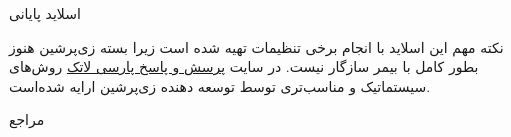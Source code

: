 \documentclass{beamer}
\begin{document}
\begin{persian}
\begin{frame}{اسلاید پایانی}
\begin{alertblock}{نکته مهم}
	این اسلاید با انجام برخی تنظیمات تهیه شده است زیرا بسته زی‌پرشین هنوز بطور کامل با بیمر سازگار نیست. در سایت 
	\href{http://qa.parsilatex.com}{پرسش و پاسخ پارسی لاتک}
 روش‌های سیستماتیک و مناسب‌تری توسط توسعه دهنده زی‌پرشین ارایه شده‌است.
\end{alertblock}


\end{frame}
\begin{frame}{مراجع}
\footnotesize
\renewcommand\refname{}
\renewcommand{\addcontentsline}[3]{}%
\renewcommand{\section}[2]{}%
 \begin{latin}

\end{latin}
\end{frame}
\end{persian}
\end{document}

